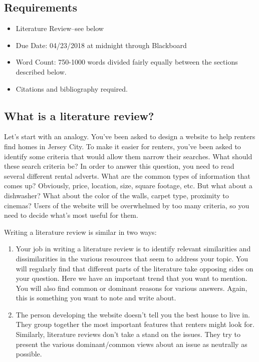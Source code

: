 \documentclass[oneside]{article}
\begin{document}
\thispagestyle{fancy}

\subsection*{Requirements}

\begin{itemize}
\item
  Literature Review--see below
\item
  Due Date: 04/23/2018 at midnight through Blackboard
\item
  Word Count: 750-1000 words divided fairly equally between the sections
  described below.
\item
  Citations and bibliography required.
\end{itemize}



\subsection*{What is a literature
review?}\label{what-is-a-literature-review}

Let's start with an analogy. You've been asked to design a website to
help renters find homes in Jersey City. To make it easier for renters,
you've been asked to identify some criteria that would allow them narrow
their searches. What should these search criteria be? In order to answer
this question, you need to read several different rental adverts. What
are the common types of information that comes up? Obviously, price,
location, size, square footage, etc. But what about a dishwasher? What
about the color of the walls, carpet type, proximity to cinemas? Users
of the website will be overwhelmed by too many criteria, so you need to
decide what's most useful for them.

Writing a literature review is similar in two ways:

\begin{enumerate}
\def\labelenumi{\arabic{enumi}.}
\itemsep1pt\parskip0pt
\item
  Your job in writing a literature review is to identify relevant
  similarities and dissimilarities in the various resources that seem to
  address your topic. You will regularly find that different parts of
  the literature take opposing sides on your question. Here we have an
  important trend that you want to mention. You will also find common or
  dominant reasons for various answers. Again, this is something you
  want to note and write about.
\item
  The person developing the website doesn't tell you the best house to
  live in. They group together the most important features that renters
  might look for. Similarly, literature reviews don't take a stand on
  the issues. They try to present the various dominant/common views
  about an issue as neutrally as possible.
\end{enumerate}
\end{document}

